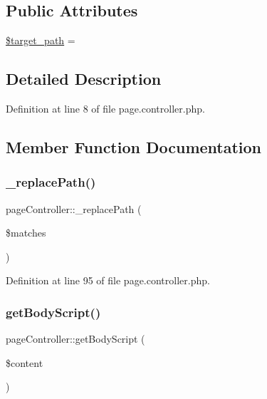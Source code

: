 \subsection*{Public Attributes}
\begin{DoxyCompactItemize}
\item 
\hyperlink{classpageController_aad7c7b9ade651130997578967a69a48c}{\$target\+\_\+path} = \textquotesingle{}\textquotesingle{}
\end{DoxyCompactItemize}


\subsection{Detailed Description}


Definition at line 8 of file page.\+controller.\+php.



\subsection{Member Function Documentation}
\hypertarget{classpageController_abd8a05c83337866bd8e06057c0e6dc4f}{}\label{classpageController_abd8a05c83337866bd8e06057c0e6dc4f} 
\subsubsection{\texorpdfstring{\+\_\+replace\+Path()}{\_replacePath()}}
{\footnotesize\ttfamily page\+Controller\+::\+\_\+replace\+Path (\begin{DoxyParamCaption}\item[{}]{\$matches }\end{DoxyParamCaption})}



Definition at line 95 of file page.\+controller.\+php.

\hypertarget{classpageController_a8c5c1bd477ffc4beda5af3b6d3cee63f}{}\label{classpageController_a8c5c1bd477ffc4beda5af3b6d3cee63f} 
\subsubsection{\texorpdfstring{get\+Body\+Script()}{getBodyScript()}}
{\footnotesize\ttfamily page\+Controller\+::get\+Body\+Script (\begin{DoxyParamCaption}\item[{}]{\$content }\end{DoxyParamCaption})}



